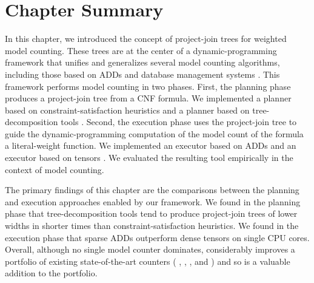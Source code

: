 \section{Chapter Summary}
\label{sec_discussion}

In this chapter, we introduced the concept of project-join trees for weighted model counting.
These trees are at the center of a dynamic-programming framework that unifies and generalizes several model counting algorithms, including those based on ADDs \cite{DPV20} and database management systems \cite{fichte2020exploiting}.
This framework performs model counting in two phases.
First, the planning phase produces a project-join tree from a CNF formula.
We implemented a planner \Htb{} based on constraint-satisfaction heuristics
\cite{tarjan1984simple,koster2001treewidth,dechter03,dechter99,bouquet1999gestion}
and a planner \Lg{} based on tree-decomposition tools \cite{strasser2017computing,Tamaki17,AMW17}.
Second, the execution phase uses the project-join tree to guide the dynamic-programming computation of the model count of the formula \wrt{} a literal-weight function.
We implemented an executor \Dmc{} based on ADDs \cite{DPV20,somenzi2015cudd} and an executor \Tensor{} based on tensors \cite{numpy}.
We evaluated the resulting tool \Dpmc{} empirically in the context of model counting.

{ \color{blue}
The primary findings of this chapter are the comparisons between the planning and execution approaches enabled by our framework.
We found in the planning phase that tree-decomposition tools tend to produce project-join trees of lower widths in shorter times than constraint-satisfaction heuristics.
We found in the execution phase that sparse ADDs outperform dense tensors on single CPU cores.
Overall, although no single model counter dominates, \Dpmc{} considerably improves a portfolio of existing state-of-the-art counters (\cachet{} \cite{sang2004combining}, \ctd{} \cite{darwiche2004new}, \df{} \cite{LM17}, and \minictd{} \cite{OD15}) and so is a valuable addition to the portfolio.
} %